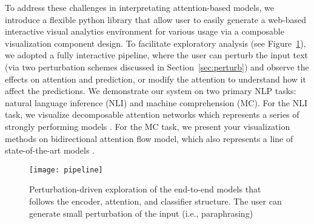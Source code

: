 To address these challenges in interpretating attention-based models, 
we introduce a flexible python library that allow user to easily generate a web-based interactive visual analytics environment for various usage via a composable visualization component design.
%
To facilitate exploratory analysis (see Figure~\ref{fig:modelPipeline}), we adopted a fully interactive pipeline, where the user can perturb the input text (via two perturbation schemes discussed in Section~\ref{sec:perturb}) and observe the effects on attention and prediction, or modify the attention to understand how it affect the predictions.
%
We demonstrate our system on two primary NLP tasks: natural language
inference (NLI) and machine comprehension (MC). For the NLI task, we visualize
decomposable attention networks which represents a series of strongly performing models \cite{Parikh2016}.
For the MC task, we present your visualization methods on bidirectional attention flow model,
which also represents a line of state-of-the-art models \cite{Seo2016}.

\begin{figure}[htbp]
\centering
\vspace{-2mm}
 \texttt{[image: pipeline]}
 \caption{
 Perturbation-driven exploration of the end-to-end models that follows the encoder, attention, and classifier structure. The user can generate small perturbation of the input (i.e., paraphrasing)
 }
\label{fig:modelPipeline}
\end{figure}



